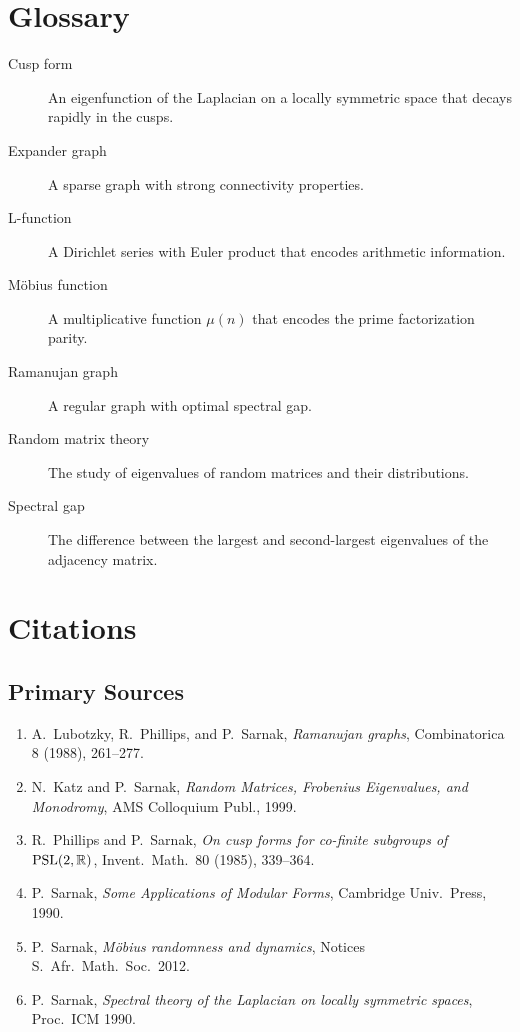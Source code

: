 \section*{Glossary}

\begin{description}
    \item[Cusp form] An eigenfunction of the Laplacian on a locally symmetric space that decays rapidly in the cusps.
    \item[Expander graph] A sparse graph with strong connectivity properties.
    \item[L-function] A Dirichlet series with Euler product that encodes arithmetic information.
    \item[M\"obius function] A multiplicative function $\mu(n)$ that encodes the prime factorization parity.
    \item[Ramanujan graph] A regular graph with optimal spectral gap.
    \item[Random matrix theory] The study of eigenvalues of random matrices and their distributions.
    \item[Spectral gap] The difference between the largest and second-largest eigenvalues of the adjacency matrix.
\end{description}

\section{Citations}\subsection*{Primary Sources}
\begin{enumerate}
    \item A.\ Lubotzky, R.\ Phillips, and P.\ Sarnak, \textit{Ramanujan graphs}, Combinatorica 8 (1988), 261--277.
    \item N.\ Katz and P.\ Sarnak, \textit{Random Matrices, Frobenius Eigenvalues, and Monodromy}, AMS Colloquium Publ., 1999.
    \item R.\ Phillips and P.\ Sarnak, \textit{On cusp forms for co-finite subgroups of $\operatorname{PSL}(2,\mathbb{R})$}, Invent.\ Math.\ 80 (1985), 339--364.
    \item P.\ Sarnak, \textit{Some Applications of Modular Forms}, Cambridge Univ.\ Press, 1990.
    \item P.\ Sarnak, \textit{M\"obius randomness and dynamics}, Notices S.\ Afr.\ Math.\ Soc.\ 2012.
    \item P.\ Sarnak, \textit{Spectral theory of the Laplacian on locally symmetric spaces}, Proc.\ ICM 1990.
\end{enumerate}

